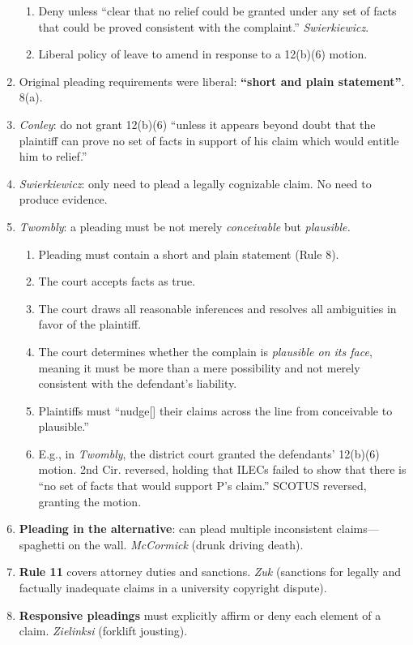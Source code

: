 \begin{enumerate}
\begin{enumerate}
        \item Deny unless ``clear that no relief could be granted under any 
        set of facts that could be proved consistent with the complaint.'' 
        \emph{Swierkiewicz}.
        \item Liberal policy of leave to amend in response to a 12(b)(6) 
        motion.
    \end{enumerate}
    \item Original pleading requirements were liberal: \textbf{``short and 
    plain statement''}. 8(a).
    \item \emph{Conley}: do not grant 12(b)(6) ``unless it appears beyond 
    doubt that the plaintiff can prove no set of facts in support of his claim 
    which would entitle him to relief.''
    \item \emph{Swierkiewicz}: only need to plead a legally cognizable claim.  
    No need to produce evidence.
    \item \emph{Twombly}: a pleading must be not merely \emph{conceivable} but 
    \emph{plausible.}
    \begin{enumerate}
        \item Pleading must contain a short and plain statement (Rule 8).
        \item The court accepts facts as true.
        \item The court draws all reasonable inferences and resolves all 
        ambiguities in favor of the plaintiff.
        \item The court determines whether the complain is \emph{plausible on 
        its face}, meaning it must be more than a mere possibility and not 
        merely consistent with the defendant's liability.
        \item Plaintiffs must ``nudge[] their claims across the line from 
        conceivable to plausible.''
        \item E.g., in \emph{Twombly}, the district court granted the 
        defendants' 12(b)(6) motion. 2nd Cir. reversed, holding that ILECs 
        failed to show that there is ``no set of facts that would support P's 
        claim.'' SCOTUS reversed, granting the motion.
    \end{enumerate}
    \item \textbf{Pleading in the alternative}: can plead multiple 
    inconsistent claims---spaghetti on the wall. \emph{McCormick} (drunk 
    driving death).
    \item \textbf{Rule 11} covers attorney duties and sanctions.  \emph{Zuk} 
    (sanctions for legally and factually inadequate claims in a university 
    copyright dispute).
    \item \textbf{Responsive pleadings} must explicitly affirm or deny each 
    element of a claim. \emph{Zielinksi} (forklift jousting).
\end{enumerate}

